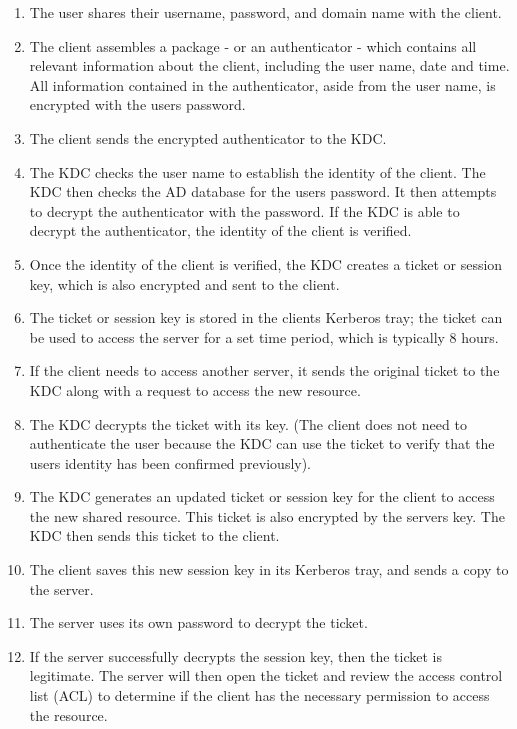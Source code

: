 \begin{enumerate}
  \item The user shares their username, password, and domain name with the client.
  \item The client assembles a package - or an authenticator - which contains all relevant information about the client, including the user name, date and time. All information contained in the authenticator, aside from the user name, is encrypted with the users password.
  \item The client sends the encrypted authenticator to the KDC.
  \item The KDC checks the user name to establish the identity of the client. The KDC then checks the AD database for the users password. It then attempts to decrypt the authenticator with the password. If the KDC is able to decrypt the authenticator, the identity of the client is verified.
  \item Once the identity of the client is verified, the KDC creates a ticket or session key, which is also encrypted and sent to the client.
  \item The ticket or session key is stored in the clients Kerberos tray; the ticket can be used to access the server for a set time period, which is typically 8 hours.
  \item If the client needs to access another server, it sends the original ticket to the KDC along with a request to access the new resource.
  \item The KDC decrypts the ticket with its key. (The client does not need to authenticate the user because the KDC can use the ticket to verify that the users identity has been confirmed previously).
  \item The KDC generates an updated ticket or session key for the client to access the new shared resource. This ticket is also encrypted by the servers key. The KDC then sends this ticket to the client.
  \item The client saves this new session key in its Kerberos tray, and sends a copy to the server.
  \item The server uses its own password to decrypt the ticket.
  \item If the server successfully decrypts the session key, then the ticket is legitimate. The server will then open the ticket and review the access control list (ACL) to determine if the client has the necessary permission to access the resource.
\end{enumerate}

